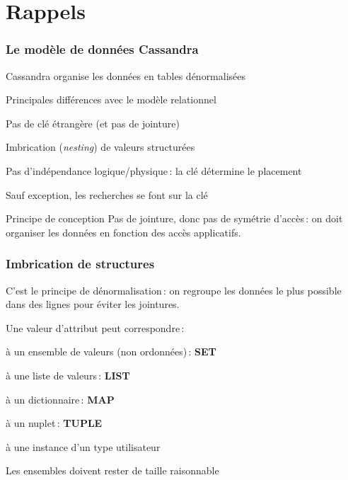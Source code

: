 
\section{Rappels}

\begin{frame} \frametitle{Le modèle de données Cassandra}

  Cassandra organise les données en \alert{tables} dénormalisées

  \vfill

  Principales différences avec le modèle relationnel

  \vfill
  \begin{redbullet}
  \item Pas de clé étrangère (et pas de jointure)
  \item Imbrication (\textit{nesting}) de valeurs structurées
  \item Pas d'indépendance logique/physique\,: la clé
      détermine le placement
   \item Sauf exception, les recherches se font sur la clé
  \end{redbullet}

  \vfill

  \begin{defblock}{Principe de conception}
  Pas de jointure, donc pas de symétrie d'accès\,: on doit organiser
  les données en fonction des accès applicatifs.

  \end{defblock}
\end{frame}


\begin{frame}[fragile]
\frametitle{Imbrication de structures}

C'est le principe de dénormalisation\,: on regroupe 
les données le plus possible dans des lignes pour éviter les jointures.

\vfill

Une valeur d'attribut  peut correspondre\,:
\begin{redbullet}
	\item à un ensemble de valeurs (non ordonnées)\,: \textbf{SET} 
	\item à une liste de valeurs\,: \textbf{LIST}
	\item à un dictionnaire\,: \textbf{MAP} 
	\item à un nuplet\,: \textbf{TUPLE} 
	\item à une instance d'un type utilisateur
\end{redbullet}

\vfill

Les ensembles doivent rester de taille raisonnable
\end{frame}


